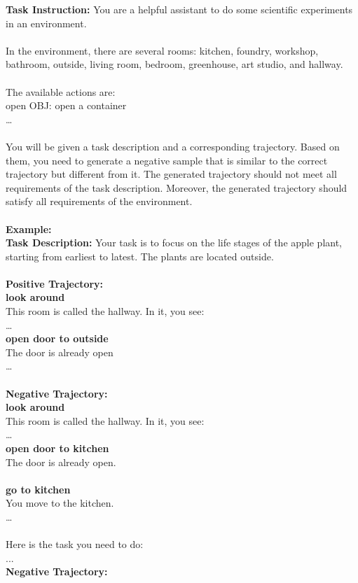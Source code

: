 \begin{tcolorbox}[breakable,title=Negative Trajectory Synthesis Prompt for ScienceWorld]
\textcolor{my_blue!50}{\textbf{Task Instruction:} You are a helpful assistant to do some scientific experiments in an environment. \\
\\
In the environment, there are several rooms: kitchen, foundry, workshop, bathroom, outside, living room, bedroom, greenhouse, art studio, and hallway. \\
\\
The available actions are: \\
open OBJ: open a container \\
… \\
\\
You will be given a task description and a corresponding trajectory. Based on them, you need to generate a negative sample that is similar to the correct trajectory but different from it. The generated trajectory should not meet all requirements of the task description. Moreover, the generated trajectory should satisfy all requirements of the environment.\\
}\\

\textcolor{my_green!50}{\textbf{Example:} }\\
\textcolor{my_purple}{
\textbf{Task Description:} Your task is to focus on the life stages of the apple plant, starting from earliest to latest. The plants are located outside.\\
\\
\textbf{Positive Trajectory:}\\
\textbf{look around}\\
This room is called the hallway. In it, you see: \\
…\\
\textbf{open door to outside}\\
The door is already open\\
…\\
\\
\textbf{Negative Trajectory:}\\
\textbf{look around}\\
This room is called the hallway. In it, you see: \\
…\\
\textbf{open door to kitchen}\\
The door is already open.\\
\\
\textbf{go to kitchen}\\
You move to the kitchen.\\
…\\
}\\
\textcolor{my_blue!50}{Here is the task you need to do:\\
... \\
\textbf{Negative Trajectory: }
}
\end{tcolorbox}
